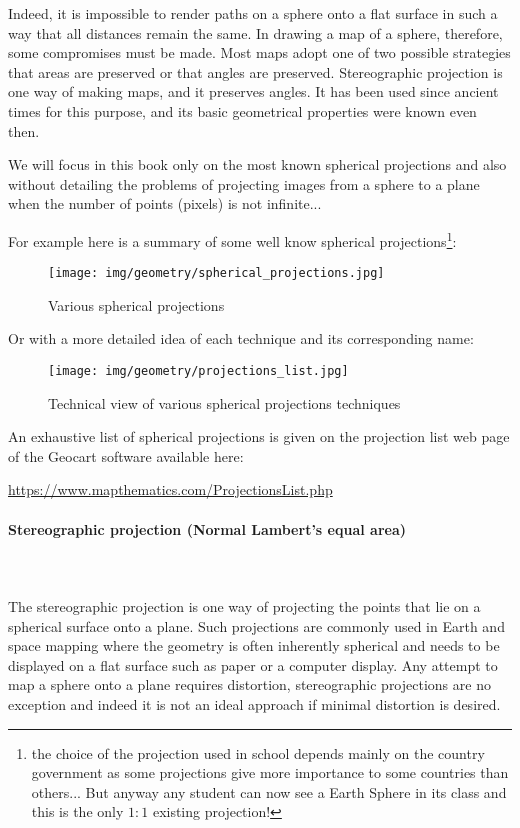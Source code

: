 	Indeed, it is impossible to render paths on a sphere onto a flat surface in such a way that all distances remain the same. In drawing a map of a sphere, therefore, some compromises must be made. Most maps adopt one of two possible strategies that areas are preserved or that angles are preserved. Stereographic projection is one way of making maps, and it preserves angles. It has been used since ancient times for this purpose, and its basic geometrical properties were known even then.

	We will focus in this book only on the most known spherical projections and also without detailing the problems of projecting images from a sphere to a plane when the number of points (pixels) is not infinite...
	
	For example here is a summary of some well know spherical projections\footnote{the choice of the projection used in school depends mainly on the country government as some projections give more importance to some countries than others... But anyway any student can now see a Earth Sphere in its class and this is the only $1:1$ existing projection!}:
	\begin{figure}[H]
		\centering
		\texttt{[image: img/geometry/spherical\_projections.jpg]}
		\caption{Various spherical projections}
	\end{figure}
	Or with a more detailed idea of each technique and its corresponding name:
	\begin{figure}[H]
		\centering
		\texttt{[image: img/geometry/projections\_list.jpg]}
		\caption{Technical view of various spherical projections techniques}
	\end{figure}
	\begin{tcolorbox}[title=Remark,colframe=black,arc=10pt]
	An exhaustive list of spherical projections is given on the projection list web page of the Geocart software available here: 	
	\begin{center}
	\url{https://www.mapthematics.com/ProjectionsList.php}
	\end{center}
	\end{tcolorbox}
	
	\paragraph{Stereographic projection (Normal Lambert's equal area)}\mbox{}\\\\
	The stereographic projection is one way of projecting the points that lie on a spherical surface onto a plane. Such projections are commonly used in Earth and space mapping where the geometry is often inherently spherical and needs to be displayed on a flat surface such as paper or a computer display. Any attempt to map a sphere onto a plane requires distortion, stereographic projections are no exception and indeed it is not an ideal approach if minimal distortion is desired. 

